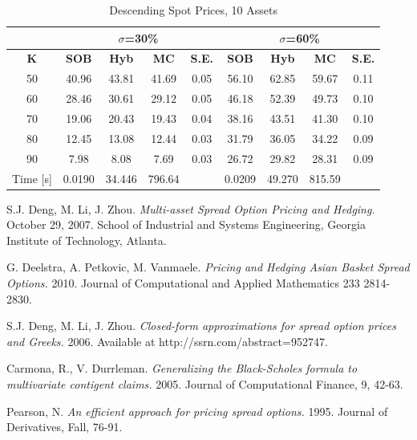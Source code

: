 \documentclass[a4paper]{article}
\begin{document}
\begin {table}
\caption {Descending Spot Prices, 10 Assets} 
\begin{center}
\begin{tabular}{c|c c c c|c c c c}
\hline
\multicolumn{1}{c|}{} & \multicolumn{4}{|c|}{$\sigma$=30\%} & \multicolumn{4}{|c}{$\sigma$=60\%} \\ 
\hline
  \textbf{K} & \textbf{SOB} & \textbf{Hyb}	& \textbf{MC}& \textbf{S.E.} & \textbf{SOB} & \textbf{Hyb} & \textbf{MC} & \textbf{S.E.} \\
50 &40.96&43.81&41.69& 0.05& 56.10& 62.85&59.67 & 0.11\\
60 &28.46&30.61& 29.12& 0.05&46.18& 52.39&49.73&0.10\\
70 &19.06&20.43& 19.43& 0.04& 38.16&43.51&41.30&0.10\\
80 &12.45&13.08& 12.44& 0.03 & 31.79&36.05& 34.22& 0.09 \\
90 &7.98& 8.08&7.69 & 0.03& 26.72&29.82&28.31&0.09\\
\hline
Time [s]& 0.0190&34.446& 796.64 & & 0.0209& 49.270&815.59 & \\
\hline
\end{tabular}
\end{center}
\end{table}

\newpage
\begin{thebibliography}{1}
S.J. Deng, M. Li, J. Zhou.
\textit{Multi-asset Spread Option Pricing and Hedging.}
October 29, 2007. School of Industrial and Systems Engineering, Georgia Institute of Technology, Atlanta.

G. Deelstra, A. Petkovic, M. Vanmaele.
\textit{Pricing and Hedging Asian Basket Spread Options.}
2010. Journal of Computational and Applied Mathematics 233 2814-2830.

S.J. Deng, M. Li,  J. Zhou. 
\textit{Closed-form approximations for spread option prices and Greeks.} 2006.
Available at http://ssrn.com/abstract=952747.

Carmona, R., V. Durrleman. 
\textit{Generalizing the Black-Scholes formula to multivariate contigent claims.} 2005. Journal of Computational Finance, 9, 42-63.

Pearson, N. 
\textit{An efficient approach for pricing spread options.} 1995. Journal of Derivatives, Fall, 76-91.

\end{thebibliography}
\end{document}
